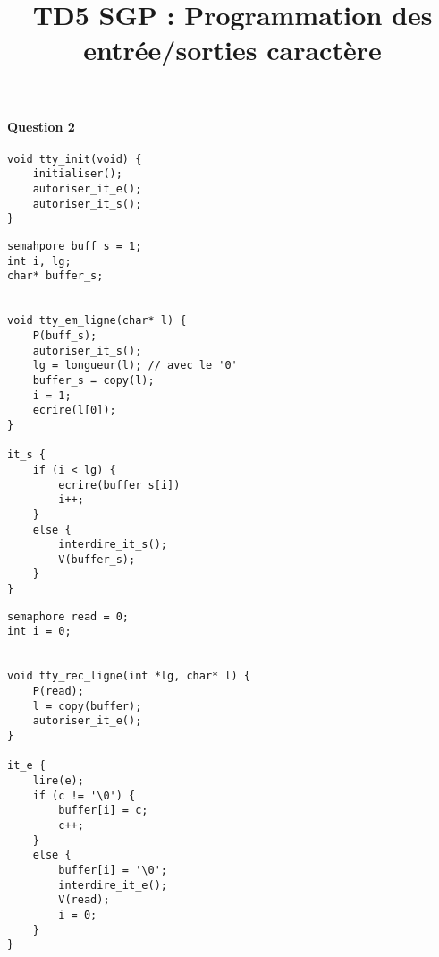 \documentclass[a4paper,french,11pt]{article}
\title{TD5 SGP : Programmation des entrée/sorties caractère}
\begin{document}
\maketitle

\paragraph{Question 2}

\begin{lstlisting}
void tty_init(void) {
    initialiser();
    autoriser_it_e();
    autoriser_it_s();
}
\end{lstlisting}

\begin{lstlisting}
semahpore buff_s = 1;
int i, lg;
char* buffer_s;


void tty_em_ligne(char* l) {
    P(buff_s);
    autoriser_it_s();
    lg = longueur(l); // avec le '0'
    buffer_s = copy(l);
    i = 1;
    ecrire(l[0]);
}

it_s {
    if (i < lg) {
        ecrire(buffer_s[i])
        i++;
    }
    else {
        interdire_it_s();
        V(buffer_s);
    }
}
\end{lstlisting}

\begin{lstlisting}
semaphore read = 0;
int i = 0;


void tty_rec_ligne(int *lg, char* l) {
    P(read);
    l = copy(buffer);
    autoriser_it_e();
}

it_e {
    lire(e);
    if (c != '\0') {
        buffer[i] = c;
        c++;
    }
    else {
        buffer[i] = '\0';
        interdire_it_e();
        V(read);
        i = 0;
    }
}
\end{lstlisting}
\end{document}
